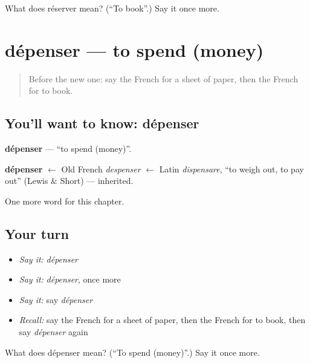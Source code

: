 \begin{tcolorbox}[breakable,colback=teal!4,colframe=teal!35!black,title={Before you move on}]
What does réserver mean? (\textquotedblleft{}To book\textquotedblright{}.) Say it once more.
\end{tcolorbox}
\section[dépenser]{dépenser — to spend (money)}

\label{lesson:FR-C205-depenser}



\begin{quote}
Before the new one: say the French for a sheet of paper, then the French for to book.
\end{quote}

\subsection*{You'll want to know: dépenser}
\textbf{dépenser} — \textquotedblleft{}to spend (money)\textquotedblright{}.

\begin{cousinweb}
\textbf{dépenser} $\leftarrow$ Old French \emph{despenser} $\leftarrow$ Latin \emph{dispensare}, \textquotedblleft{}to weigh out, to pay out\textquotedblright{} (Lewis \& Short) — inherited.
\end{cousinweb}

\begin{grammarlens}[title={What you've built}]
One more word for this chapter.
\end{grammarlens}

\subsection*{Your turn}
\begin{itemize}
\raggedright
  \item \emph{Say it:} \emph{dépenser}
  \item \emph{Say it:} \emph{dépenser}, once more
  \item \emph{Say it:} say \emph{dépenser}
  \item \emph{Recall:} say the French for a sheet of paper, then the French for to book, then say \emph{dépenser} again
\end{itemize}

\begin{tcolorbox}[breakable,colback=teal!4,colframe=teal!35!black,title={Before you move on}]
What does dépenser mean? (\textquotedblleft{}To spend (money)\textquotedblright{}.) Say it once more.
\end{tcolorbox}
